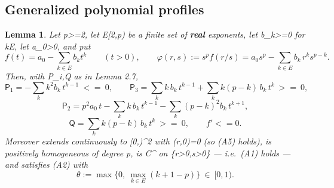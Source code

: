 \documentclass[10pt,reqno]{amsart}
\def\({}\def\){}%
\def\ge{>=}\def\le{<=}%
\newtheorem{lemma}[theorem]{Lemma}
\theoremstyle{definition}
\theoremstyle{remark}
\begin{document}
\subsection{Generalized polynomial profiles}\label{subsec:polynomial-profiles}

\begin{lemma}\label{lem:2-8}
Let \(p\ge2\), let \(E\subset[2,p)\) be a finite set of \textbf{real} exponents, let \(b_k\ge0\) for \(k\in E\), let \(a_0>0\), and put \[f(t)=a_0-\sum_{k\in E} b_kt^k\qquad(t>0),\qquad
\varphi(r,s):=s^pf(r/s)=a_0s^p-\sum_{k\in E}b_k\,r^ks^{p-k} .\] Then, with \(\mathsf P_i,\mathsf Q\) as in Lemma 2.7, \[\mathsf P_1=-\sum_{k}k^2b_k\,t^{k-1}\ \le\ 0,\qquad
\mathsf P_3=\sum_{k}k\,b_k\,t^{k-1}+\sum_{k}k(p-k)\,b_k\,t^{k}\ \ge\ 0,\] \[\mathsf P_2=p^2a_0\,t-\sum_{k}k\,b_k\,t^{k-1}-\sum_{k}(p-k)^2b_k\,t^{k+1},\] \[\mathsf Q=\sum_{k}k(p-k)\,b_k\,t^{k}\ \ge\ 0 ,\qquad f'\le0 .\] Moreover \(\varphi\) extends continuously to \([0,\infty)^2\) with \(\varphi(r,0)=0\) (so (A5) holds), is positively homogeneous of degree \(p\), is \(C^\infty\) on \(\{r>0,s>0\}\) --- i.e.~(A1) holds --- and satisfies (A2) with \[\theta:=\max\Big\{0,\ \max_{k\in E}(k+1-p)\Big\}\ \in\ [0,1).\]
\end{lemma}
\end{document}

